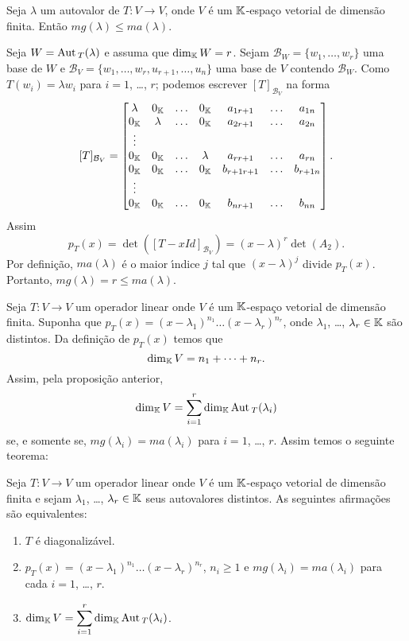 \begin{proposicao}
	Seja $\lambda$ um autovalor de $T : V \to V$, onde $V$ \'e um $\mathbb{K}$-espa\c{c}o vetorial de dimens\~ao finita. Ent\~ao $mg(\lambda) \le ma(\lambda)$.
\end{proposicao}
\begin{prova}
	Seja $W = {\rm Aut\,}_T(\lambda)$ e assuma que $\dim_{\mathbb{K}}W = r$. Sejam $\mathcal{B}_W = \{w_1,\dots,w_r\}$ uma base de $W$ e $\mathcal{B}_V = \{w_1,\dots,w_r,u_{r + 1},\dots,u_n\}$ uma base de $V$ contendo $\mathcal{B}_W$. Como $T(w_i) = \lambda w_i$ para $i = 1$, \dots, $r$; podemos escrever $[T]_{\mathcal{B}_V}$ na forma
	\[
		[T]_{\mathcal{B}_V} = \begin{bmatrix}
			\lambda & 0_{\mathbb{K}} & \dots & 0_{\mathbb{K}} & a_{1r+1} & \dots & a_{1n}\\
			0_{\mathbb{K}} & \lambda &  \dots & 0_{\mathbb{K}} & a_{2r+1} & \dots & a_{2n}\\
			\vdots\\
			0_{\mathbb{K}} & 0_{\mathbb{K}} & \dots & \lambda & a_{rr+1} & \dots & a_{rn}\\
			0_{\mathbb{K}} & 0_{\mathbb{K}} & \dots & 0_{\mathbb{K}} & b_{r+1r+1} & \dots & b_{r+1n}\\
			\vdots\\
			0_{\mathbb{K}} & 0_{\mathbb{K}} & \dots & 0_{\mathbb{K}} & b_{nr+1} & \dots & b_{nn}\\
		\end{bmatrix}.
	\]
	Assim
	\[
		p_T(x) = \det([T - xId]_{\mathcal{B}_V}) = (x - \lambda)^r\det(A_2).
	\]
	Por defini\c{c}\~ao, $ma(\lambda)$ \'e o maior {\'\i}ndice $j$ tal que $(x - \lambda)^j$ divide $p_T(x)$. Portanto, $mg(\lambda) = r \le ma(\lambda)$.
\end{prova}

Seja $T : V \to V$ um operador linear onde $V$ \'e um $\mathbb{K}$-espa\c{c}o vetorial de dimens\~ao finita. Suponha que $p_T(x) = (x - \lambda_1)^{n_1}\dots(x - \lambda_r)^{n_r}$, onde $\lambda_1$, \dots, $\lambda_r \in \mathbb{K}$ s\~ao distintos. Da defini\c{c}\~ao de $p_T(x)$ temos que
\[
	\dim_{\mathbb{K}}V = n_1 + \cdots + n_r.
\]
Assim, pela proposi\c{c}\~ao anterior,
\[
	\dim_{\mathbb{K}}V = \sum_{i = 1}^r \dim_{\mathbb{K}}{\rm Aut\,}_T(\lambda_i)
\]
se, e somente se, $mg(\lambda_i) = ma(\lambda_i)$ para $i = 1$, \dots, $r$. Assim temos o seguinte teorema:
\begin{teorema}
	Seja $T : V \to V$ um operador linear onde $V$ \'e um $\mathbb{K}$-espa\c{c}o vetorial de dimens\~ao finita e sejam $\lambda_1$, \dots, $\lambda_r \in \mathbb{K}$ seus autovalores distintos. As seguintes afirma\c{c}\~oes s\~ao equivalentes:
	\begin{enumerate}[label={\roman*})]
		\item $T$ \'e diagonaliz\'avel.
		\item $p_T(x) = (x - \lambda_1)^{n_1}\dots(x - \lambda_r)^{n_r}$, $n_i \ge 1$ e $mg(\lambda_i) = ma(\lambda_i)$ para cada $i = 1$, \dots, $r$.
		\item $\dim_{\mathbb{K}}V = \displaystyle\sum_{i = 1}^r \dim_{\mathbb{K}}{\rm Aut\,}_T(\lambda_i)$.
	\end{enumerate}
\end{teorema}

